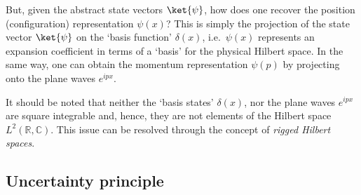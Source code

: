    But, given the abstract state vectors $\ket{\psi}$, how does one recover the position (configuration) representation $\psi(x)$? This is simply the projection of the state vector $\ket{\psi}$ on the `basis function' $\delta(x)$, i.e.~$\psi(x)$ represents an expansion coefficient in terms of a `basis' for the physical Hilbert space. In the same way, one can obtain the momentum representation $\psi(p)$ by projecting onto the plane waves $e^{ipx}$.

    \begin{remark}
        It should be noted that neither the `basis states' $\delta(x)$, nor the plane waves $e^{ipx}$ are square integrable and, hence, they are not elements of the Hilbert space $L^2(\mathbb{R},\mathbb{C})$. This issue can be resolved through the concept of \textit{rigged Hilbert spaces}.
    \end{remark}

\subsection{Uncertainty principle}



